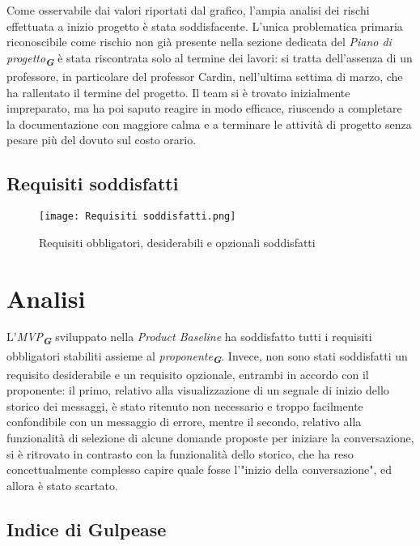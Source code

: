 Come osservabile dai valori riportati dal grafico, l’ampia analisi dei rischi effettuata a
inizio progetto è stata soddisfacente. L'unica problematica primaria
riconoscibile come rischio non già presente
nella sezione dedicata del \emph{Piano di progetto}\textsubscript{\textbf{\textit{G}}} è stata riscontrata solo al termine dei lavori: si tratta dell'assenza di un professore, in particolare del professor Cardin, nell'ultima settima di marzo, che ha rallentato il termine del progetto. Il team si è trovato inizialmente impreparato, ma ha poi saputo reagire in modo efficace, riuscendo a completare la documentazione con maggiore calma e a terminare le attività di progetto senza pesare più del dovuto sul costo orario.

\newpage

\subsection{Requisiti soddisfatti}
\label{subsec:Requisiti soddisfatti}

\begin{figure}[h] 
    \centering
    \texttt{[image: Requisiti soddisfatti.png]}
    \caption{Requisiti obbligatori, desiderabili e opzionali soddisfatti} 
    \label{fig: Requisiti soddisfatti}
\end{figure}

\section*{Analisi}
L'\emph{MVP}\textsubscript{\textbf{\textit{G}}} sviluppato nella \emph{Product Baseline} ha soddisfatto tutti i requisiti obbligatori stabiliti assieme al \emph{proponente}\textsubscript{\textbf{\textit{G}}}. Invece, non sono stati soddisfatti un requisito desiderabile e un requisito opzionale, entrambi in accordo con il proponente: il primo, relativo alla visualizzazione di un segnale di inizio dello storico dei messaggi, è stato ritenuto non necessario e troppo facilmente confondibile con un messaggio di errore, mentre il secondo, relativo alla funzionalità di selezione di alcune domande proposte per iniziare la conversazione, si è ritrovato in contrasto con la funzionalità dello storico, che ha reso concettualmente complesso capire quale fosse l'"inizio della conversazione", ed allora è stato scartato.

\newpage

\subsection{Indice di Gulpease}
\label{subsec:Indice di Gulpease}

